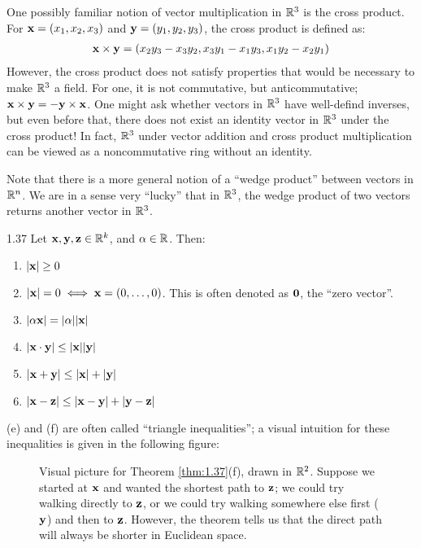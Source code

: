 One possibly familiar notion of vector multiplication in $\mathbb{R}^3$ is the cross product. For $\mathbf{x} = (x_1, x_2, x_3)$ and $\mathbf{y} = (y_1, y_2, y_3)$, the cross product is defined as:
\begin{align*}
    \mathbf{x} \times \mathbf{y} = (x_2y_3 - x_3y_2, x_3y_1 - x_1y_3, x_1y_2 - x_2y_1)
\end{align*}
However, the cross product does not satisfy properties that would be necessary to make $\mathbb{R}^3$ a field. For one, it is not commutative, but anticommutative; $\mathbf{x} \times \mathbf{y} = -\mathbf{y} \times \mathbf{x}$. One might ask whether vectors in $\mathbb{R}^3$ have well-defind inverses, but even before that, there does not exist an identity vector in $\mathbb{R}^3$ under the cross product! In fact, $\mathbb{R}^3$ under vector addition and cross product multiplication can be viewed as a noncommutative ring without an identity. 

Note that there is a more general notion of a ``wedge product'' between vectors in $\mathbb{R}^n$. We are in a sense very ``lucky'' that in $\mathbb{R}^3$, the wedge product of two vectors returns another vector in $\mathbb{R}^3$. 

\begin{theorem}{}{1.37}
    Let $\mathbf{x}, \mathbf{y}, \mathbf{z} \in \mathbb{R}^k$, and $\alpha \in \mathbb{R}$. Then:
    \begin{enumerate}
        \item $\abs{\mathbf{x}} \geq 0$
        \item $\abs{\mathbf{x}} = 0 \iff \mathbf{x} = (0, \ldots, 0)$. This is often denoted as $\mathbf{0}$, the ``zero vector''. 
        \item $\abs{\alpha\mathbf{x}} = \abs{\alpha}\abs{\mathbf{x}}$
        \item $\abs{\mathbf{x} \cdot \mathbf{y}} \leq \abs{\mathbf{x}}\abs{\mathbf{y}}$ 
        \item $\abs{\mathbf{x} + \mathbf{y}} \leq \abs{\mathbf{x}} + \abs{\mathbf{y}}$
        \item $\abs{\mathbf{x} - \mathbf{z}} \leq \abs{\mathbf{x} - \mathbf{y}} + \abs{\mathbf{y} - \mathbf{z}}$
    \end{enumerate}
\end{theorem}
\noindent (e) and (f) are often called ``triangle inequalities''; a visual intuition for these inequalities is given in the following figure:
\begin{figure}[htbp]
    \centering
    \caption{Visual picture for Theorem \ref{thm:1.37}(f), drawn in $\mathbb{R}^2$. Suppose we started at $\mathbf{x}$ and wanted the shortest path to $\mathbf{z}$; we could try walking directly to $\mathbf{z}$, or we could try walking somewhere else first ($\mathbf{y}$) and then to $\mathbf{z}$. However, the theorem tells us that the direct path will always be shorter in Euclidean space.}
    \label{fig3}
\end{figure}

